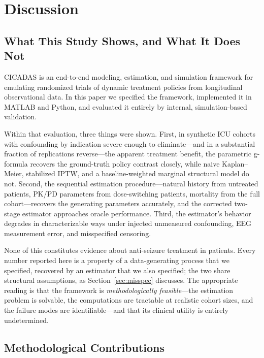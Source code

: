 \section{Discussion}
\label{sec:discussion}

\subsection{What This Study Shows, and What It Does Not}

CICADAS is an end-to-end modeling, estimation, and simulation framework for emulating randomized
trials of dynamic treatment policies from longitudinal observational data. In this paper we
specified the framework, implemented it in MATLAB and Python, and evaluated it entirely by internal,
simulation-based validation.

Within that evaluation, three things were shown. First, in synthetic ICU cohorts with confounding by
indication severe enough to eliminate---and in a substantial fraction of replications reverse---the
apparent treatment benefit, the parametric g-formula recovers the ground-truth policy contrast
closely, while naive Kaplan--Meier, stabilized IPTW, and a baseline-weighted marginal structural
model do not. Second, the sequential estimation procedure---natural history from untreated patients,
PK/PD parameters from dose-switching patients, mortality from the full cohort---recovers the
generating parameters accurately, and the corrected two-stage estimator approaches oracle
performance. Third, the estimator's behavior degrades in characterizable ways under injected
unmeasured confounding, EEG measurement error, and misspecified censoring.

None of this constitutes evidence about anti-seizure treatment in patients. Every number reported
here is a property of a data-generating process that we specified, recovered by an estimator that we
also specified; the two share structural assumptions, as Section~\ref{sec:misspec} discusses. The
appropriate reading is that the framework is \emph{methodologically feasible}---the estimation
problem is solvable, the computations are tractable at realistic cohort sizes, and the failure modes
are identifiable---and that its clinical utility is entirely undetermined.

\subsection{Methodological Contributions}

